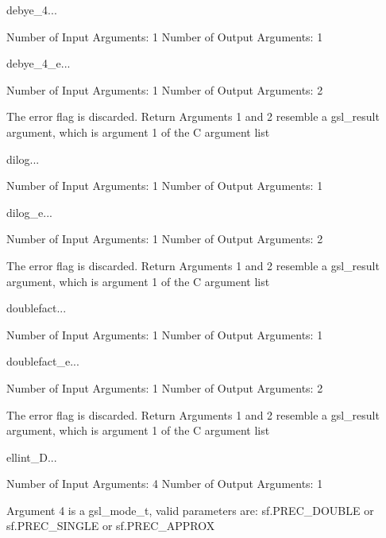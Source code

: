 \begin{funcdesc}{debye_4}{...}

    Number of Input  Arguments:  1
    Number of Output Arguments:  1
\end{funcdesc}

\begin{funcdesc}{debye_4_e}{...}

    Number of Input  Arguments:  1
    Number of Output Arguments:  2

The error flag is discarded.
Return Arguments 1 and 2 resemble a gsl_result argument,
	which is  argument 1 of the C argument list

\end{funcdesc}

\begin{funcdesc}{dilog}{...}

    Number of Input  Arguments:  1
    Number of Output Arguments:  1
\end{funcdesc}

\begin{funcdesc}{dilog_e}{...}

    Number of Input  Arguments:  1
    Number of Output Arguments:  2

The error flag is discarded.
Return Arguments 1 and 2 resemble a gsl_result argument,
	which is  argument 1 of the C argument list

\end{funcdesc}

\begin{funcdesc}{doublefact}{...}

    Number of Input  Arguments:  1
    Number of Output Arguments:  1
\end{funcdesc}

\begin{funcdesc}{doublefact_e}{...}

    Number of Input  Arguments:  1
    Number of Output Arguments:  2

The error flag is discarded.
Return Arguments 1 and 2 resemble a gsl_result argument,
	which is  argument 1 of the C argument list

\end{funcdesc}

\begin{funcdesc}{ellint_D}{...}

    Number of Input  Arguments:  4
    Number of Output Arguments:  1

 Argument 4 is a gsl_mode_t, valid parameters are:
	sf.PREC_DOUBLE or sf.PREC_SINGLE or sf.PREC_APPROX

\end{funcdesc}

